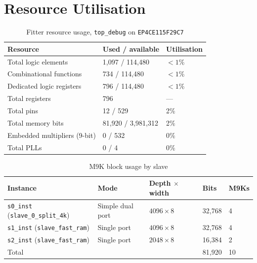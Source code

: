 \documentclass[11pt,a4paper]{article}
\newcommand{\sig}[1]{\texttt{#1}}
\begin{document}
\section{Resource Utilisation}

\begin{table}[htbp]
\centering
\caption{Fitter resource usage, \sig{top\_debug} on \sig{EP4CE115F29C7}}
\label{tab:resources}
\small
\begin{tabular}{lll}
\toprule
\textbf{Resource} & \textbf{Used / available} & \textbf{Utilisation} \\
\midrule
Total logic elements            & 1{,}097 / 114{,}480 & $<1\%$ \\
\quad Combinational functions   &   734 / 114{,}480   & $<1\%$ \\
\quad Dedicated logic registers &   796 / 114{,}480   & $<1\%$ \\
Total registers                 &   796               & --- \\
Total pins                      &    12 / 529         & 2\% \\
Total memory bits               & 81{,}920 / 3{,}981{,}312 & 2\% \\
Embedded multipliers (9-bit)    &     0 / 532         & 0\% \\
Total PLLs                      &     0 / 4           & 0\% \\
\bottomrule
\end{tabular}
\end{table}

\begin{table}[htbp]
\centering
\caption{M9K block usage by slave}
\label{tab:m9k}
\small
\begin{tabular}{lllll}
\toprule
\textbf{Instance} & \textbf{Mode} & \textbf{Depth $\times$ width} & \textbf{Bits} & \textbf{M9Ks} \\
\midrule
\sig{s0\_inst} (\sig{slave\_0\_split\_4k}) & Simple dual port & $4096\times8$ & 32{,}768 & 4 \\
\sig{s1\_inst} (\sig{slave\_fast\_ram})    & Single port      & $4096\times8$ & 32{,}768 & 4 \\
\sig{s2\_inst} (\sig{slave\_fast\_ram})    & Single port      & $2048\times8$ & 16{,}384 & 2 \\
\midrule
\multicolumn{3}{l}{Total} & 81{,}920 & 10 \\
\bottomrule
\end{tabular}
\end{table}
\end{document}
